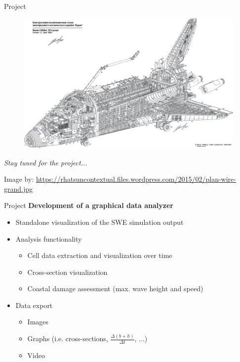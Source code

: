 \documentclass[shortpres,usenames,dvipsnames]{beamer}
\begin{document}
\begin{frame}{Project}
	\begin{center}
		\begin{figure}
			\includegraphics[clip,width=0.75\linewidth]{img/buran.jpeg}
		\end{figure}
		\vspace{15pt}
		\textit{\large Stay tuned for the project...}	
	\end{center}
	{\tiny Image by: \url{https://rhatsuncontextual.files.wordpress.com/2015/02/plan-wire-grand.jpg}}
\end{frame}

\begin{frame}{Project}
	\textbf{Development of a graphical data analyzer}
	\begin{itemize}
		\item Standalone visualization of the SWE simulation output
		\item Analysis functionality
		\begin{itemize}
			\item Cell data extraction and visualization over time
			\item Cross-section visualization
			\item Coastal damage assessment (max. wave height and speed)
		\end{itemize}
		\item Data export
		\begin{itemize}
			\item Images
			\item Graphs (i.e. cross-sections, $\frac{\varDelta (b+h)}{\varDelta t}$, ...)
			\item Video
		\end{itemize}
	\end{itemize}
\end{frame}

\end{document}

